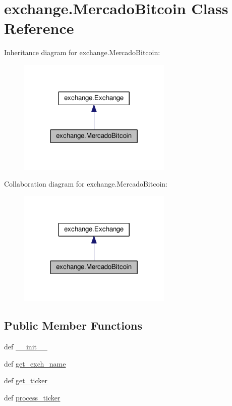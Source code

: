 \hypertarget{classexchange_1_1_mercado_bitcoin}{\section{exchange.\-Mercado\-Bitcoin Class Reference}
\label{classexchange_1_1_mercado_bitcoin}
}


Inheritance diagram for exchange.\-Mercado\-Bitcoin\-:
\nopagebreak
\begin{figure}[H]
\begin{center}
\leavevmode
\includegraphics[width=208pt]{classexchange_1_1_mercado_bitcoin__inherit__graph}
\end{center}
\end{figure}


Collaboration diagram for exchange.\-Mercado\-Bitcoin\-:
\nopagebreak
\begin{figure}[H]
\begin{center}
\leavevmode
\includegraphics[width=208pt]{classexchange_1_1_mercado_bitcoin__coll__graph}
\end{center}
\end{figure}
\subsection*{Public Member Functions}
\begin{DoxyCompactItemize}
\item 
def \hyperlink{classexchange_1_1_mercado_bitcoin_ad9e1645fbd904d31d0db7728a2470a90}{\-\_\-\-\_\-init\-\_\-\-\_\-}
\item 
def \hyperlink{classexchange_1_1_mercado_bitcoin_a5f11d825752724de5c31262447f03781}{get\-\_\-exch\-\_\-name}
\item 
def \hyperlink{classexchange_1_1_mercado_bitcoin_ae651664c24cb7b31973cdf2cdf281628}{get\-\_\-ticker}
\item 
def \hyperlink{classexchange_1_1_mercado_bitcoin_a1ca10d96c4b4a39236c8312857046994}{process\-\_\-ticker}
\end{DoxyCompactItemize}
